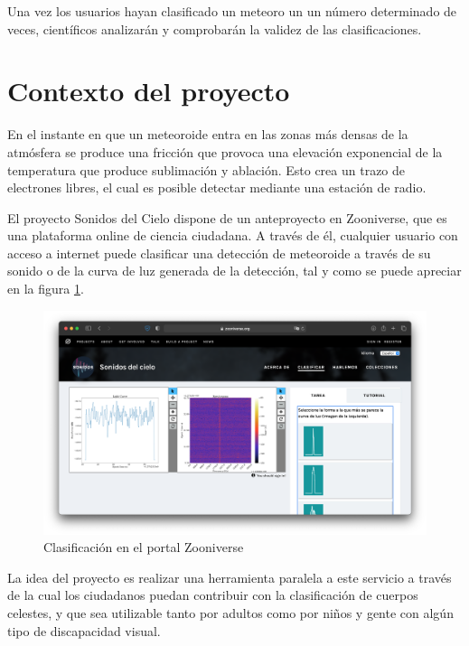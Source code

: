 Una vez los usuarios hayan clasificado un meteoro un un número determinado de veces, científicos analizarán y comprobarán la validez de las clasificaciones.
\vspace*{1cm}

\section{Contexto del proyecto}

En el instante en que un meteoroide entra en las zonas más densas de la atmósfera se produce una fricción que provoca una elevación exponencial de la temperatura que produce sublimación y ablación. 
Esto crea un trazo de electrones libres, el cual es posible detectar mediante una estación de radio.

El proyecto Sonidos del Cielo dispone de un anteproyecto en Zooniverse, que es una plataforma online de ciencia ciudadana. A través de él, cualquier usuario con acceso a internet puede clasificar una detección de meteoroide a través de su sonido o de la curva de luz generada de la detección, tal y como se puede apreciar en la figura \ref{fig:web_zooniverse}.

\begin{figure} [h]
    \centering
    \includegraphics[width=\textwidth]{include/figuras/Zooniverse.png}
    \caption{Clasificación en el portal Zooniverse}
    \label{fig:web_zooniverse}
\end{figure}

La idea del proyecto es realizar una herramienta paralela a este servicio a través de la cual los ciudadanos puedan contribuir con la clasificación de cuerpos celestes, y que sea utilizable tanto por adultos como por niños y gente con algún tipo de discapacidad visual.

